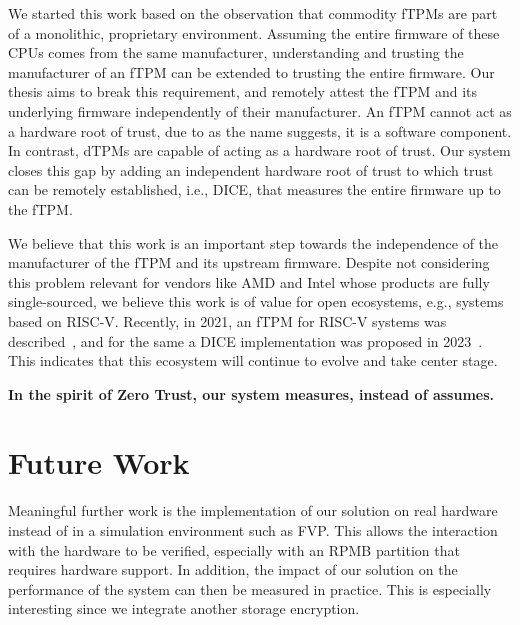 We started this work based on the observation that commodity \acp{fTPM} are part of a monolithic, proprietary environment.
Assuming the entire firmware of these CPUs comes from the same manufacturer, understanding and trusting the manufacturer of an \ac{fTPM} can be extended to trusting the entire firmware.
Our thesis aims to break this requirement, and remotely attest the \ac{fTPM} and its underlying firmware independently of their manufacturer.
An \ac{fTPM} cannot act as a hardware root of trust, due to as the name suggests, it is a software component.
In contrast, \acp{dTPM} are capable of acting as a hardware root of trust.
Our system closes this gap by adding an independent hardware root of trust to which trust can be remotely established, i.e., \ac{DICE}, that measures the entire firmware up to the \ac{fTPM}.



We believe that this work is an important step towards the independence of the manufacturer of the \ac{fTPM} and its upstream firmware. %
Despite not considering this problem relevant for vendors like AMD and Intel whose products are fully single-sourced, we believe this work is of value for open ecosystems, e.g., systems based on RISC-V\@.
Recently, in 2021, an \ac{fTPM} for RISC-V systems was described~\cite{Boubakri2021}, and for the same a \ac{DICE} implementation was proposed in 2023~\cite{Bravi2023}.
This indicates that this ecosystem will continue to evolve and take center stage.

\textbf{In the spirit of Zero Trust, our system measures, instead of assumes.}

\section{Future Work}

Meaningful further work is the implementation of our solution on real hardware instead of in a simulation environment such as FVP\@.
This allows the interaction with the hardware to be verified, especially with an RPMB partition that requires hardware support.
In addition, the impact of our solution on the performance of the system can then be measured in practice.
This is especially interesting since we integrate another storage encryption.

